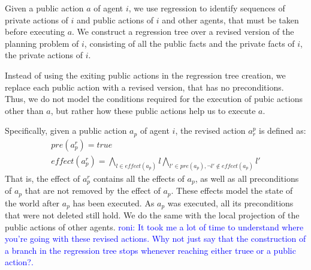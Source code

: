 \documentclass[letterpaper]{article}
\newcommand\roni[1]{\textcolor{blue}{roni: #1}}
\theoremstyle{definition}
\begin{document}
Given a public action $a$ of agent $i$, we use regression to identify sequences of private actions of $i$ and public actions of $i$ and other agents, that must be taken before executing $a$. We construct a regression tree over a revised version of the planning problem of $i$, consisting of all the public facts and the private facts of $i$, the private actions of $i$. 

Instead of using the exiting public actions in the regression tree creation, we replace each public action with a revised version, that has no preconditions. Thus, we do not model the conditions required for the execution of pubic actions other than $a$, but rather how these public actions help us to execute $a$. 



Specifically, given a public action $a_p$ of agent $i$, the revised action $a^p_r$ is defined as:
\begin{eqnarray}
&pre(a^r_p)=true&\\
&effect(a^r_p)=\bigwedge_{l \in effect(a_p)}l \bigwedge_{l' \in pre(a_p), \neg l' \not\in effect(a_p)}l'&
\end{eqnarray}
That is, the effect of $a^r_p$ contains all the effects of $a_p$, as well as all preconditions of $a_p$ that are not removed by the effect of $a_p$. These effects model the state of the world after $a_p$ has been executed. As $a_p$ was executed, all its preconditions that were not deleted still hold. We do the same with the local projection of the public actions of other agents.
\roni{It took me a lot of time to understand where you're going with these revised actions. Why not just say that the construction of a branch in the regression tree stops whenever reaching either truee or a public action?.}




\end{document}
